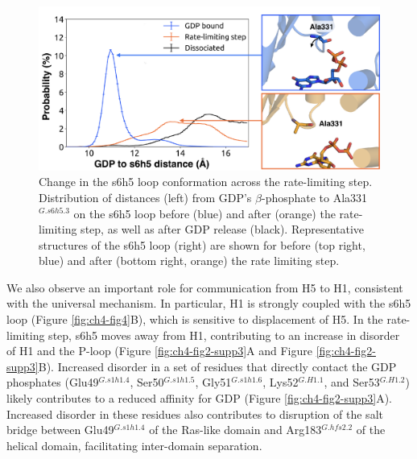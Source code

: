 \documentclass[../main.tex]{subfiles}
\begin{document}
        \begin{figure}[!htb] %
            \centering
            \includegraphics[width=5in]{ch4-fig5.png}
            \caption[Change in the s6h5 loop conformation across the rate-limiting step.]
                {Change in the s6h5 loop conformation across the rate-limiting step. Distribution of distances (left) from GDP’s $\beta$-phosphate to Ala331$^{G.s6h5.3}$ on the s6h5 loop before (blue) and after (orange) the rate-limiting step, as well as after GDP release (black). Representative structures of the s6h5 loop (right) are shown for before (top right, blue) and after (bottom right, orange) the rate limiting step.}
            \label{fig:ch4-fig5}
        \end{figure}

        We also observe an important role for communication from H5 to H1, consistent with the universal mechanism. In particular, H1 is strongly coupled with the s6h5 loop (Figure \ref{fig:ch4-fig4}B), which is sensitive to displacement of H5. In the rate-limiting step, s6h5 moves away from H1, contributing to an increase in disorder of H1 and the P-loop (Figure \ref{fig:ch4-fig2-supp3}A and Figure \ref{fig:ch4-fig2-supp3}B). Increased disorder in a set of residues that directly contact the GDP phosphates (Glu49$^{G.s1h1.4}$, Ser50$^{G.s1h1.5}$, Gly51$^{G.s1h1.6}$, Lys52$^{G.H1.1}$, and Ser53$^{G.H1.2}$) likely contributes to a reduced affinity for GDP (Figure \ref{fig:ch4-fig2-supp3}A). Increased disorder in these residues also contributes to disruption of the salt bridge between Glu49$^{G.s1h1.4}$ of the Ras-like domain and Arg183$^{G.hfs2.2}$ of the helical domain, facilitating inter-domain separation.
\end{document}
